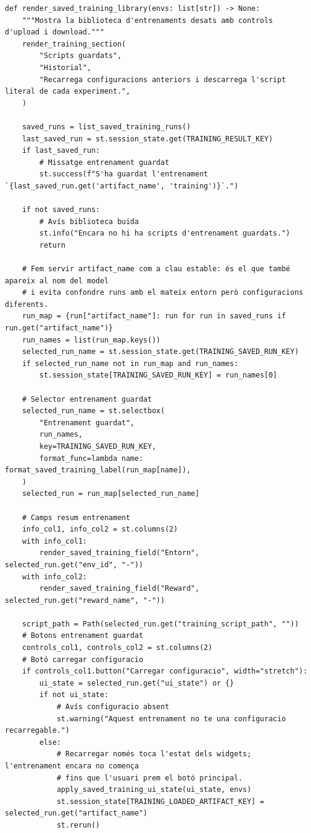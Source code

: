 \documentclass[10pt,a4paper]{article}
\begin{document}
\begin{lstlisting}[style=studioPython,caption={page\_components/training\_shared.py},label={lst:page-components-training-shared-py}]
def render_saved_training_library(envs: list[str]) -> None:
    """Mostra la biblioteca d'entrenaments desats amb controls d'upload i download."""
    render_training_section(
        "Scripts guardats",
        "Historial",
        "Recarrega configuracions anteriors i descarrega l'script literal de cada experiment.",
    )

    saved_runs = list_saved_training_runs()
    last_saved_run = st.session_state.get(TRAINING_RESULT_KEY)
    if last_saved_run:
        # Missatge entrenament guardat
        st.success(f"S'ha guardat l'entrenament `{last_saved_run.get('artifact_name', 'training')}`.")

    if not saved_runs:
        # Avís biblioteca buida
        st.info("Encara no hi ha scripts d'entrenament guardats.")
        return

    # Fem servir artifact_name com a clau estable: és el que també apareix al nom del model
    # i evita confondre runs amb el mateix entorn però configuracions diferents.
    run_map = {run["artifact_name"]: run for run in saved_runs if run.get("artifact_name")}
    run_names = list(run_map.keys())
    selected_run_name = st.session_state.get(TRAINING_SAVED_RUN_KEY)
    if selected_run_name not in run_map and run_names:
        st.session_state[TRAINING_SAVED_RUN_KEY] = run_names[0]

    # Selector entrenament guardat
    selected_run_name = st.selectbox(
        "Entrenament guardat",
        run_names,
        key=TRAINING_SAVED_RUN_KEY,
        format_func=lambda name: format_saved_training_label(run_map[name]),
    )
    selected_run = run_map[selected_run_name]

    # Camps resum entrenament
    info_col1, info_col2 = st.columns(2)
    with info_col1:
        render_saved_training_field("Entorn", selected_run.get("env_id", "-"))
    with info_col2:
        render_saved_training_field("Reward", selected_run.get("reward_name", "-"))

    script_path = Path(selected_run.get("training_script_path", ""))
    # Botons entrenament guardat
    controls_col1, controls_col2 = st.columns(2)
    # Botó carregar configuracio
    if controls_col1.button("Carregar configuracio", width="stretch"):
        ui_state = selected_run.get("ui_state") or {}
        if not ui_state:
            # Avís configuracio absent
            st.warning("Aquest entrenament no te una configuracio recarregable.")
        else:
            # Recarregar només toca l'estat dels widgets; l'entrenament encara no comença
            # fins que l'usuari prem el botó principal.
            apply_saved_training_ui_state(ui_state, envs)
            st.session_state[TRAINING_LOADED_ARTIFACT_KEY] = selected_run.get("artifact_name")
            st.rerun()


\end{lstlisting}
\end{document}
